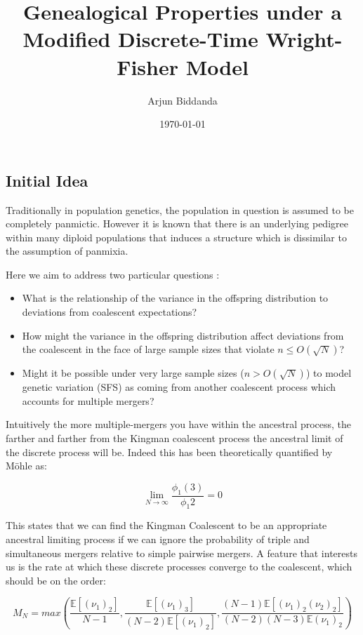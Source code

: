 \documentclass[11pt]{article}
\title{Genealogical Properties under a Modified Discrete-Time Wright-Fisher Model}
\author{Arjun Biddanda}
\date{\today}
\begin{document}
\maketitle
\linenumbers

\subsection{Initial Idea}

Traditionally in population genetics, the population in question is assumed to be completely panmictic. However it is known that there is an underlying pedigree within many diploid populations that induces a structure which is dissimilar to the assumption of panmixia.

Here we aim to address two particular questions : 

\begin{itemize}
	\item What is the relationship of the variance in the offspring distribution to deviations from coalescent expectations?
	\item How might the variance in the offspring distribution affect deviations from the coalescent in the face of large sample sizes that violate $n \leq O(\sqrt{N})$?
	\item Might it be possible under very large sample sizes ($n > O(\sqrt{N})$) to model genetic variation (SFS) as coming from another coalescent process which accounts for multiple mergers?
\end{itemize}

Intuitively the more multiple-mergers you have within the ancestral process, the farther and farther from the Kingman coalescent process the ancestral limit of the discrete process will be. Indeed this has been theoretically quantified by M\"{o}hle \cite{Mohle2000} as:

$$\lim_{N \rightarrow \infty} \frac{\phi_1(3)}{\phi_1{2}} = 0$$

This states that we can find the Kingman Coalescent to be an appropriate ancestral limiting process if we can ignore the probability of triple and simultaneous mergers relative to simple pairwise mergers. A feature that interests us is the rate at which these discrete processes converge to the coalescent, which should be on the order:

$$M_N = max\left( \frac{\mathbb{E}[(\nu_1)_2]}{N-1} , \frac{\mathbb{E}[(\nu_1)_3]}{(N-2)\mathbb{E}[(\nu_1)_2]}, \frac{(N-1)\mathbb{E}[(\nu_1)_2(\nu_2)_2]}{(N-2)(N-3)\mathbb{E}(\nu_1)_2} \right)$$
\end{document}
